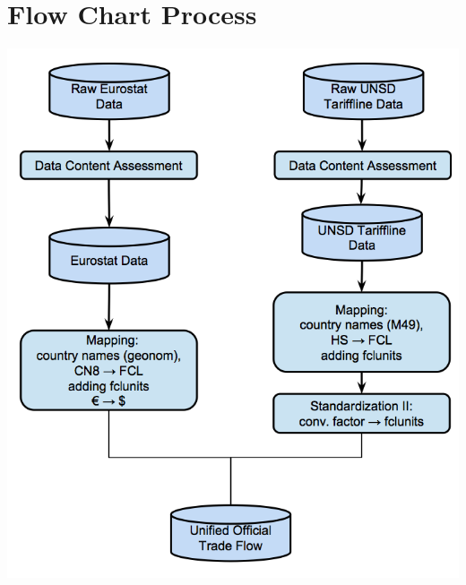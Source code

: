 \documentclass[nojss]{jss}\usepackage[]{graphicx}\usepackage[]{color}
\begin{document}
\section{Flow Chart Process}
\begin{center}\includegraphics[scale = 0.01]{"trade_1"}\end{center}
\newpage
\end{document}
